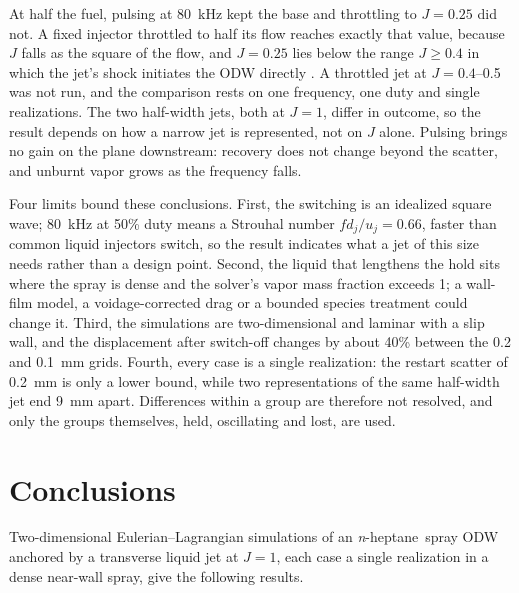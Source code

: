 \documentclass[aip,pof,preprint,amsmath,amssymb]{revtex4-2}
\newcommand{\nh}{\textit{n}-heptane}
\begin{document}
At half the fuel, pulsing at 80~kHz kept the base and throttling to $J = 0.25$ did not. A fixed injector throttled to half its flow reaches exactly that value, because $J$ falls as the square of the flow, and $J = 0.25$ lies below the range $J \ge 0.4$ in which the jet's shock initiates the ODW directly \cite{Wang2026ast}. A throttled jet at $J = 0.4$--0.5 was not run, and the comparison rests on one frequency, one duty and single realizations. The two half-width jets, both at $J = 1$, differ in outcome, so the result depends on how a narrow jet is represented, not on $J$ alone. Pulsing brings no gain on the plane downstream: recovery does not change beyond the scatter, and unburnt vapor grows as the frequency falls.

Four limits bound these conclusions. First, the switching is an idealized square wave; 80~kHz at 50\% duty means a Strouhal number $f d_j/u_j = 0.66$, faster than common liquid injectors switch, so the result indicates what a jet of this size needs rather than a design point. Second, the liquid that lengthens the hold sits where the spray is dense and the solver's vapor mass fraction exceeds 1; a wall-film model, a voidage-corrected drag or a bounded species treatment could change it. Third, the simulations are two-dimensional and laminar with a slip wall, and the displacement after switch-off changes by about 40\% between the 0.2 and 0.1~mm grids. Fourth, every case is a single realization: the restart scatter of 0.2~mm is only a lower bound, while two representations of the same half-width jet end 9~mm apart. Differences within a group are therefore not resolved, and only the groups themselves, held, oscillating and lost, are used.

\section{Conclusions}\label{sec:conclusions}

Two-dimensional Eulerian--Lagrangian simulations of an \nh\ spray ODW anchored by a transverse liquid jet at $J = 1$, each case a single realization in a dense near-wall spray, give the following results.
\end{document}
